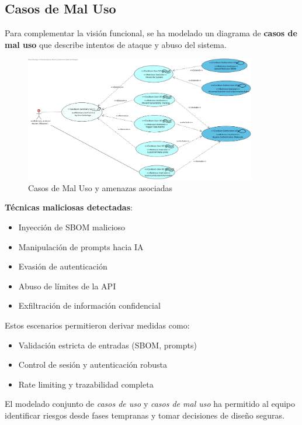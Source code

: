 \documentclass[11pt]{article}
\begin{document}
\subsection{Casos de Mal Uso}

Para complementar la visión funcional, se ha modelado un diagrama de \textbf{casos de mal uso} que describe intentos de ataque y abuso del sistema.

\begin{figure}[H]
    \centering
    \includegraphics[width=0.9\textwidth]{images/mal_uso.png}
    \caption{Casos de Mal Uso y amenazas asociadas}
\end{figure}

\textbf{Técnicas maliciosas detectadas}:

\begin{itemize}
    \item Inyección de SBOM malicioso
    \item Manipulación de prompts hacia IA
    \item Evasión de autenticación
    \item Abuso de límites de la API
    \item Exfiltración de información confidencial
\end{itemize}

Estos escenarios permitieron derivar medidas como:

\begin{itemize}
    \item Validación estricta de entradas (SBOM, prompts)
    \item Control de sesión y autenticación robusta
    \item Rate limiting y trazabilidad completa
\end{itemize}

El modelado conjunto de \textit{casos de uso} y \textit{casos de mal uso} ha permitido al equipo identificar riesgos desde fases tempranas y tomar decisiones de diseño seguras.
\end{document}

